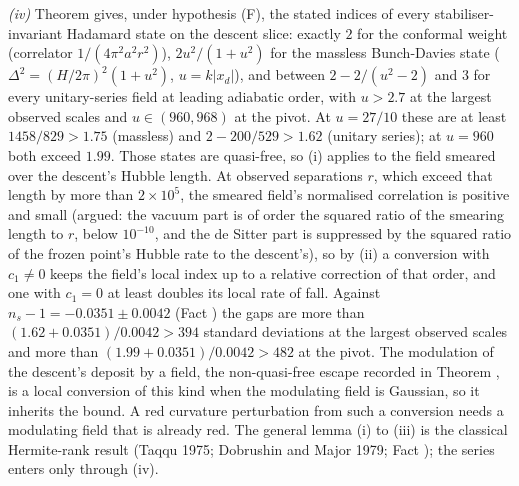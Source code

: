\emph{(iv)} Theorem  gives, under hypothesis (F), the stated indices of every stabiliser-invariant Hadamard state on the descent slice: exactly $2$ for the conformal weight (correlator $1/(4\pi^{2}a^{2}r^{2})$), $2u^{2}/(1 + u^{2})$ for the massless Bunch-Davies state ($\Delta^{2} = (H/2\pi)^{2}(1 + u^{2})$, $u = k|x_{d}|$), and between $2 - 2/(u^{2} - 2)$ and $3$ for every unitary-series field at leading adiabatic order, with $u > 2.7$ at the largest observed scales and $u \in (960, 968)$ at the pivot. At $u = 27/10$ these are at least $1458/829 > 1.75$ (massless) and $2 - 200/529 > 1.62$ (unitary series); at $u = 960$ both exceed $1.99$. Those states are quasi-free, so (i) applies to the field smeared over the descent's Hubble length. At observed separations $r$, which exceed that length by more than $2 \times 10^{5}$, the smeared field's normalised correlation is positive and small (argued: the vacuum part is of order the squared ratio of the smearing length to $r$, below $10^{-10}$, and the de Sitter part is suppressed by the squared ratio of the frozen point's Hubble rate to the descent's), so by (ii) a conversion with $c_{1} \neq 0$ keeps the field's local index up to a relative correction of that order, and one with $c_{1} = 0$ at least doubles its local rate of fall. Against $n_{s} - 1 = -0.0351 \pm 0.0042$ (Fact ) the gaps are more than $(1.62 + 0.0351)/0.0042 > 394$ standard deviations at the largest observed scales and more than $(1.99 + 0.0351)/0.0042 > 482$ at the pivot. The modulation of the descent's deposit by a field, the non-quasi-free escape recorded in Theorem , is a local conversion of this kind when the modulating field is Gaussian, so it inherits the bound. A red curvature perturbation from such a conversion needs a modulating field that is already red. The general lemma (i) to (iii) is the classical Hermite-rank result (Taqqu 1975; Dobrushin and Major 1979; Fact ); the series enters only through (iv).
